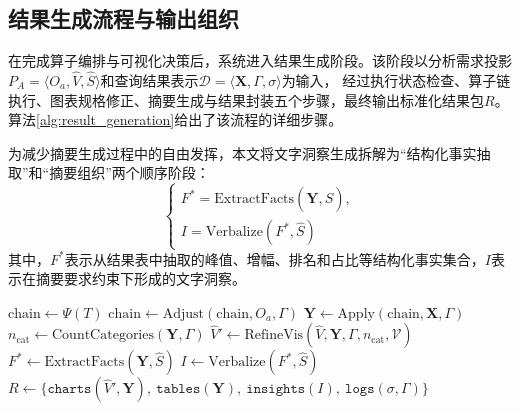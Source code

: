 \subsection{结果生成流程与输出组织}\label{subsec:result_pipeline}

在完成算子编排与可视化决策后，系统进入结果生成阶段。该阶段以分析需求投影$P_A = \langle O_a, \hat{V}, \hat{S} \rangle$和查询结果表示$\mathcal{D} = \langle \mathbf{X}, \Gamma, \sigma \rangle$为输入，
经过执行状态检查、算子链执行、图表规格修正、摘要生成与结果封装五个步骤，最终输出标准化结果包$R$。
算法\ref{alg:result_generation}给出了该流程的详细步骤。

为减少摘要生成过程中的自由发挥，本文将文字洞察生成拆解为“结构化事实抽取”和“摘要组织”两个顺序阶段：
\begin{equation}
    \begin{cases}
        F^{*} = \text{ExtractFacts}(\mathbf{Y}, \hat{S}), \\
I = \text{Verbalize}(F^{*}, \hat{S})
    \end{cases}
\label{eq:insight_pipeline}
\end{equation}
其中，$F^{*}$表示从结果表中抽取的峰值、增幅、排名和占比等结构化事实集合，$I$表示在摘要要求约束下形成的文字洞察。

\begin{algorithm}[htbp]
	    $\text{chain} \leftarrow \Psi(T)$
	    $\text{chain} \leftarrow \text{Adjust}(\text{chain}, O_a, \Gamma)$
	    $\mathbf{Y} \leftarrow \text{Apply}(\text{chain}, \mathbf{X}, \Gamma)$
	    $n_{\text{cat}} \leftarrow \text{CountCategories}(\mathbf{Y}, \Gamma)$
	    $\hat{V}' \leftarrow \text{RefineVis}(\hat{V}, \mathbf{Y}, \Gamma, n_{\text{cat}}, \mathcal{V})$
	    $F^{*} \leftarrow \text{ExtractFacts}(\mathbf{Y}, \hat{S})$
	    $I \leftarrow \text{Verbalize}(F^{*}, \hat{S})$
	    $R \leftarrow \{\texttt{charts}(\hat{V}', \mathbf{Y}),\ \texttt{tables}(\mathbf{Y}),\ \texttt{insights}(I),\ \texttt{logs}(\sigma, \Gamma)\}$\;
	    \caption{分析结果生成算法}\label{alg:result_generation}
\end{algorithm}

